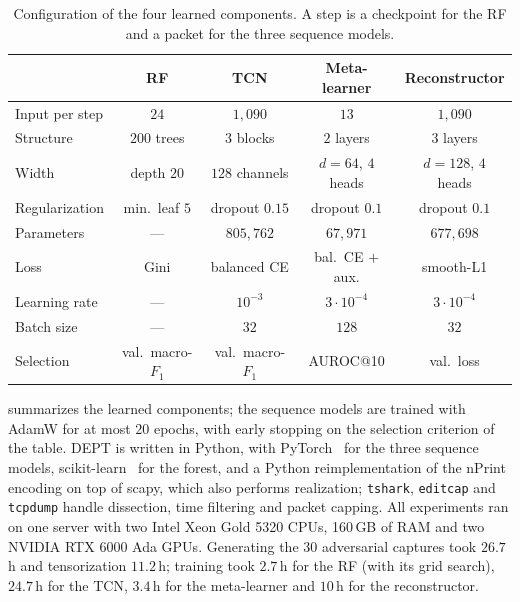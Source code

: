 \documentclass[acmtog,nonacm,pbalance]{acmart}
\begin{document}
\begin{table}[t]
  \caption{Configuration of the four learned components. A step is a checkpoint
  for the RF and a packet for the three sequence models.}
  \label{tab:config}
  \footnotesize
  \setlength{\tabcolsep}{3.5pt}
  \begin{tabular}{@{}lcccc@{}}
    \toprule
    & RF & TCN & Meta-learner & Reconstructor \\
    \midrule
    Input per step & $24$ & $1{,}090$ & $13$ & $1{,}090$ \\
    Structure & $200$ trees & $3$ blocks & $2$ layers & $3$ layers \\
    Width & depth $20$ & $128$ channels & $d=64$, $4$ heads & $d=128$, $4$ heads \\
    Regularization & min.\ leaf $5$ & dropout $0.15$ & dropout $0.1$ & dropout $0.1$ \\
    Parameters & --- & $805{,}762$ & $67{,}971$ & $677{,}698$ \\
    Loss & Gini & balanced CE & bal.\ CE $+$ aux. & smooth-L1 \\
    Learning rate & --- & $10^{-3}$ & $3\cdot10^{-4}$ & $3\cdot10^{-4}$ \\
    Batch size & --- & $32$ & $128$ & $32$ \\
    Selection & val.\ macro-$F_1$ & val.\ macro-$F_1$ & AUROC@10 & val.\ loss \\
    \bottomrule
  \end{tabular}
\end{table}

 summarizes the learned components; the sequence models are
trained with AdamW for at most $20$ epochs, with early stopping on the
selection criterion of the table. DEPT is written in Python, with PyTorch~\cite{paszke2019pytorch} for the three sequence models,
scikit-learn~\cite{pedregosa2011scikit} for the forest, and a Python reimplementation of the nPrint
encoding on top of scapy, which also performs realization; \texttt{tshark},
\texttt{editcap} and \texttt{tcpdump} handle dissection, time filtering and
packet capping. All experiments ran on one server with two Intel Xeon Gold 5320
CPUs, 160\,GB of RAM and two NVIDIA RTX 6000 Ada GPUs. Generating the 30
adversarial captures took $26.7$\,h and tensorization $11.2$\,h; training took
$2.7$\,h for the RF (with its grid search), $24.7$\,h for the TCN, $3.4$\,h for
the meta-learner and $10$\,h for the reconstructor.

\end{document}
